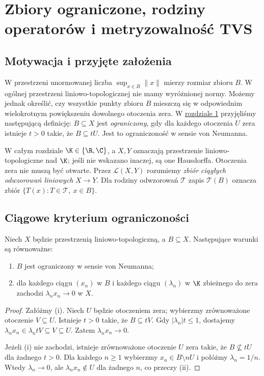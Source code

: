\setcounter{section}{3}
\section{Zbiory ograniczone, rodziny operatorów i metryzowalność TVS}\label{sec:rodziny-metryzowalnosc}

\providecommand{\atlasref}[2]{#2}


\subsection{Motywacja i przyjęte założenia}

W przestrzeni unormowanej liczba $\sup_{x\in B}\|x\|$ mierzy
rozmiar zbioru $B$. W ogólnej przestrzeni liniowo-topologicznej
nie mamy wyróżnionej normy. Możemy jednak określić, czy wszystkie
punkty zbioru $B$ mieszczą się w odpowiednim wielokrotnym
powiększeniu dowolnego otoczenia zera. W \hyperref[sec:tvs]{rozdziale 1} przyjęliśmy
następującą definicję: $B\subseteq X$ jest \emph{ograniczony}, gdy
dla każdego otoczenia $U$ zera istnieje $t>0$ takie, że
$B\subseteq tU$. Jest to ograniczoność w sensie von Neumanna.

W całym rozdziale $\K\in\{\R,\C\}$, a $X,Y$ oznaczają
przestrzenie liniowo-topologiczne nad $\K$; jeśli nie wskazano
inaczej, są one Hausdorffa. Otoczenia zera nie muszą być otwarte.
Przez $\mathcal L(X,Y)$ rozumiemy \emph{zbiór ciągłych odwzorowań
liniowych} $X\to Y$. Dla rodziny odwzorowań $\mathcal T$
zapis $\mathcal T(B)$ oznacza zbiór
$\{T(x):T\in\mathcal T,\ x\in B\}$.

\subsection{Ciągowe kryterium ograniczoności}

\begin{twierdzenie}
\label{thm:bounded-sequential-test}
Niech $X$ będzie przestrzenią liniowo-topologiczną, a
$B\subseteq X$. Następujące warunki są równoważne:
\begin{enumerate}[label=\textup{(\roman*)}]
\item $B$ jest ograniczony w sensie von Neumanna;
\item dla każdego ciągu $(x_n)$ w $B$ i każdego ciągu
      $(\lambda_n)$ w $\K$ zbieżnego do zera zachodzi
      $\lambda_nx_n\to0$ w $X$.
\end{enumerate}
\end{twierdzenie}
\begin{proof}
Załóżmy (i). Niech $U$ będzie otoczeniem zera; wybierzmy
zrównoważone otoczenie $V\subseteq U$.
Istnieje $t>0$ takie, że $B\subseteq tV$.
Gdy $|\lambda_n|t\le1$, dostajemy
$\lambda_nx_n\in\lambda_ntV\subseteq V\subseteq U$.
Zatem $\lambda_nx_n\to0$.

Jeżeli (i) nie zachodzi, istnieje zrównoważone otoczenie
$U$ zera takie, że $B\not\subseteq tU$ dla żadnego $t>0$.
Dla każdego $n\ge1$ wybierzmy $x_n\in B\setminus nU$
i połóżmy $\lambda_n=1/n$. Wtedy $\lambda_n\to0$,
ale $\lambda_nx_n\notin U$ dla żadnego $n$, co przeczy (ii).
\end{proof}

